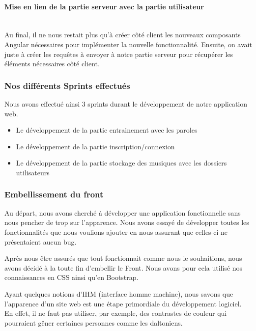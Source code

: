 \documentclass[12pt,french]{article}
\begin{document}
\paragraph{Mise en lien de la partie serveur avec la partie utilisateur \\\\}


Au final, il ne nous restait plus qu'à créer côté client les nouveaux composants Angular nécessaires pour implémenter la nouvelle fonctionnalité. Ensuite, on avait juste à créer les requêtes à envoyer à notre partie serveur pour récupérer les éléments nécessaires côté client.

\subsubsection{Nos différents Sprints effectués}

Nous avons effectué ainsi 3 \gls{sprint}s durant le développement de notre application web.

\begin{itemize}
	\item Le développement de la partie entrainement avec les paroles
	\item Le développement de la partie inscription/connexion
	\item Le développement de la partie stockage des musiques avec les dossiers utilisateurs
\end{itemize}


\subsubsection{Embellissement du front}

Au départ, nous avons cherché à développer une application fonctionnelle sans nous pencher de trop sur l'apparence. Nous avons essayé de développer toutes les fonctionnalités que nous voulions ajouter en nous assurant que celles-ci ne présentaient aucun bug.

\medskip

Après nous être assurés que tout fonctionnait comme nous le souhaitions, nous avons décidé à la toute fin d'embellir le \gls{Front}. Nous avons pour cela utilisé nos connaissances en \gls{CSS} ainsi qu'en Bootstrap.

\medskip

Ayant quelques notions d'IHM (interface homme machine), nous savons que l'apparence d'un site web est une étape primordiale du développement logiciel. En effet, il ne faut pas utiliser, par exemple, des contrastes de couleur qui pourraient gêner certaines personnes comme les daltoniens.
\end{document}
